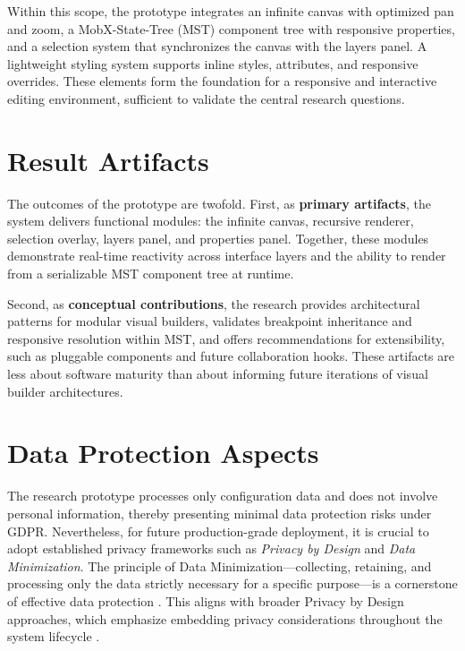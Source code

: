 \documentclass[oneside,12pt]{book}
\begin{document}
  Within this scope, the prototype integrates an infinite canvas with optimized pan and zoom, a 
  MobX-State-Tree (MST) component tree with responsive properties, and a selection system that 
  synchronizes the canvas with the layers panel. A lightweight styling system supports inline styles, 
  attributes, and responsive overrides. These elements form the foundation for a responsive and 
  interactive editing environment, sufficient to validate the central research questions.
  
  \section{Result Artifacts}
  
  The outcomes of the prototype are twofold. First, as \textbf{primary artifacts}, the system delivers 
  functional modules: the infinite canvas, recursive renderer, selection overlay, layers panel, and 
  properties panel. Together, these modules demonstrate real-time reactivity across interface layers 
  and the ability to render from a serializable MST component tree at runtime. 
  
  Second, as \textbf{conceptual contributions}, the research provides architectural patterns for 
  modular visual builders, validates breakpoint inheritance and responsive resolution within MST, 
  and offers recommendations for extensibility, such as pluggable components and future 
  collaboration hooks. These artifacts are less about software maturity than about informing 
  future iterations of visual builder architectures.
  
  \section{Data Protection Aspects}

The research prototype processes only configuration data and does not involve personal information, thereby presenting minimal data protection risks under GDPR. Nevertheless, for future production-grade deployment, it is crucial to adopt established privacy frameworks such as \emph{Privacy by Design} and \emph{Data Minimization}. The principle of Data Minimization—collecting, retaining, and processing only the data strictly necessary for a specific purpose—is a cornerstone of effective data protection \cite{ganesh2024dataMinimization}. This aligns with broader Privacy by Design approaches, which emphasize embedding privacy considerations throughout the system lifecycle \cite{jezova2020privacyByDesign, danezis2015privacyByDesign}.
\end{document}
